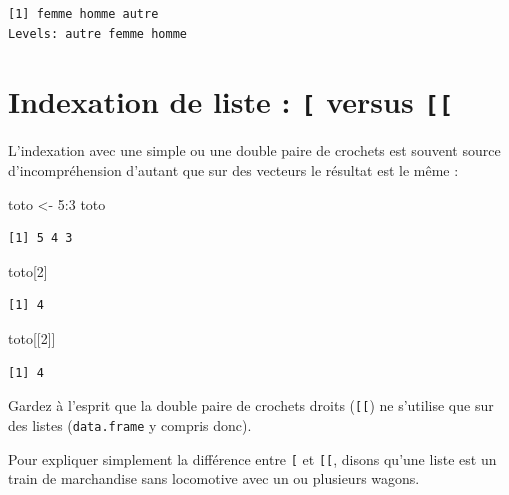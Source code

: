 \documentclass[
  letterpaper,
  DIV=11,
  numbers=noendperiod]{scrreprt}
\newenvironment{Shaded}{\begin{snugshade}}{\end{snugshade}}
\newcommand{\DecValTok}[1]{\textcolor[rgb]{0.68,0.00,0.00}{#1}}
\newcommand{\NormalTok}[1]{\textcolor[rgb]{0.00,0.23,0.31}{#1}}
\newcommand{\OtherTok}[1]{\textcolor[rgb]{0.00,0.23,0.31}{#1}}
\newcommand{\SpecialCharTok}[1]{\textcolor[rgb]{0.37,0.37,0.37}{#1}}
\begin{document}
\begin{verbatim}
[1] femme homme autre
Levels: autre femme homme
\end{verbatim}

\hypertarget{indexation-de-liste-versus}{%
\section{\texorpdfstring{Indexation de liste : \texttt{{[}} versus
\texttt{{[}{[}}}{Indexation de liste : {[} versus {[}{[}}}\label{indexation-de-liste-versus}}

L'indexation avec une simple ou une double paire de crochets est souvent
source d'incompréhension d'autant que sur des vecteurs le résultat est
le même :

\begin{Shaded}
\begin{Highlighting}[]
\NormalTok{toto }\OtherTok{\textless{}{-}} \DecValTok{5}\SpecialCharTok{:}\DecValTok{3}
\NormalTok{toto}
\end{Highlighting}
\end{Shaded}

\begin{verbatim}
[1] 5 4 3
\end{verbatim}

\begin{Shaded}
\begin{Highlighting}[]
\NormalTok{toto[}\DecValTok{2}\NormalTok{]}
\end{Highlighting}
\end{Shaded}

\begin{verbatim}
[1] 4
\end{verbatim}

\begin{Shaded}
\begin{Highlighting}[]
\NormalTok{toto[[}\DecValTok{2}\NormalTok{]]}
\end{Highlighting}
\end{Shaded}

\begin{verbatim}
[1] 4
\end{verbatim}

Gardez à l'esprit que la double paire de crochets droits
(\texttt{{[}{[}}) ne s'utilise que sur des listes (\texttt{data.frame} y
compris donc).

Pour expliquer simplement la différence entre \texttt{{[}} et
\texttt{{[}{[}}, disons qu'une liste est un train de marchandise sans
locomotive avec un ou plusieurs wagons.
\end{document}
